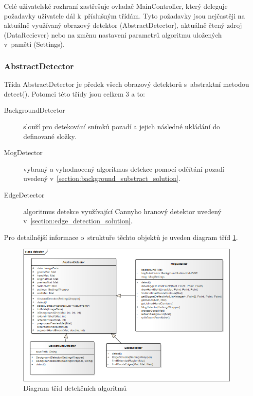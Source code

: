     Celé uživatelské rozhraní zastřešuje ovladač MainController, který deleguje požadavky uživatele dál k~příslušným třídám. Tyto požadavky jsou nejčastěji na aktuálně využívaný obrazový detektor (AbstractDetector), aktuálně čtený zdroj (DataReciever) nebo na změnu nastavení parametrů algoritmu uložených v~paměti (Settings).    
    
	\subsubsection{AbstractDetector}
    Třída AbstractDetector je předek všech obrazový detektorů s~abstraktní metodou detect(). Potomci této třídy jsou celkem 3 a to: 
    \begin{description}
    \item [BackgroundDetector] slouží pro detekování snímků pozadí a jejich následné ukládání do definované složky.
    \item [MogDetector] vybraný a vyhodnocený algoritmus detekce pomocí odčítání pozadí uvedený v~\ref{section:background_substract_solution}.
    \item [EdgeDetector] algoritmus detekce využívající Cannyho hranový detektor uvedený v~\ref{section:edge_detection_solution}.
    \end{description}
     Pro detailnější informace o~struktuře těchto objektů je uveden diagram tříd \ref{fig:ea_class_detector}.

    \begin{figure}[h]
      \centering
      \includegraphics[width=1\textwidth]{images/ea_class_detector.png}
      \caption{Diagram tříd detekčních algoritmů}
      \label{fig:ea_class_detector}
    \end{figure} 
    
